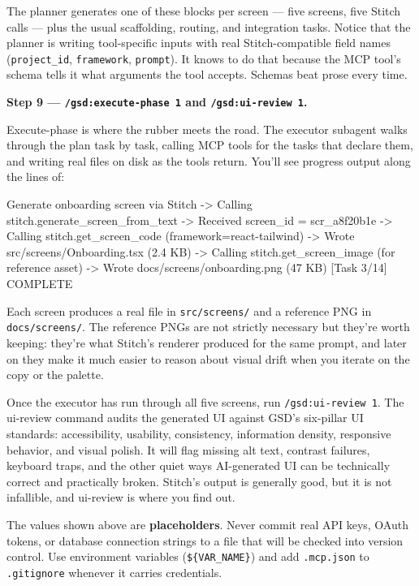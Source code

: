 \documentclass[11pt,letterpaper,openany]{book}
\newcommand{\credentialwarning}{%
\begin{gsdwarning}[Credential Safety]
The values shown above are \textbf{placeholders}. Never commit real API keys,
OAuth tokens, or database connection strings to a file that will be checked
into version control. Use environment variables (\texttt{\$\{VAR\_NAME\}}) and
add \texttt{.mcp.json} to \texttt{.gitignore} whenever it carries credentials.
\end{gsdwarning}%
}
\begin{document}
\begin{gsdscenario}
The planner generates one of these blocks per screen --- five screens,
five Stitch calls --- plus the usual scaffolding, routing, and
integration tasks. Notice that the planner is writing tool-specific
inputs with real Stitch-compatible field names (\texttt{project\_id},
\texttt{framework}, \texttt{prompt}). It knows to do that because the
MCP tool's schema tells it what arguments the tool accepts. Schemas
beat prose every time.

\vspace{6pt}
\textbf{Step 9 --- \texttt{/gsd:execute-phase 1} and
\texttt{/gsd:ui-review 1}.}
\vspace{4pt}

Execute-phase is where the rubber meets the road. The executor
subagent walks through the plan task by task, calling MCP tools for
the tasks that declare them, and writing real files on disk as the
tools return. You'll see progress output along the lines of:

\begin{gsdplain}
[Task 3/14] Generate onboarding screen via Stitch
  -> Calling stitch.generate_screen_from_text
  -> Received screen_id = scr_a8f20b1e
  -> Calling stitch.get_screen_code (framework=react-tailwind)
  -> Wrote src/screens/Onboarding.tsx (2.4 KB)
  -> Calling stitch.get_screen_image (for reference asset)
  -> Wrote docs/screens/onboarding.png (47 KB)
[Task 3/14] COMPLETE
\end{gsdplain}

Each screen produces a real file in \texttt{src/screens/} and a
reference PNG in \texttt{docs/screens/}. The reference PNGs are not
strictly necessary but they're worth keeping: they're what Stitch's
renderer produced for the same prompt, and later on they make it
much easier to reason about visual drift when you iterate on the
copy or the palette.

Once the executor has run through all five screens, run
\texttt{/gsd:ui-review 1}. The ui-review command audits the generated
UI against GSD's six-pillar UI standards: accessibility, usability,
consistency, information density, responsive behavior, and visual
polish. It will flag missing alt text, contrast failures, keyboard
traps, and the other quiet ways AI-generated UI can be technically
correct and practically broken. Stitch's output is generally good,
but it is not infallible, and ui-review is where you find out.

\credentialwarning

\vspace{4pt}
\end{gsdscenario}
\end{document}
